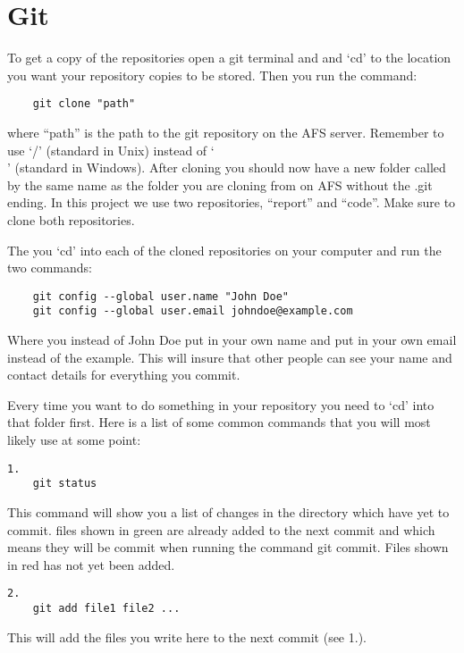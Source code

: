 \section{Git}

To get a copy of the repositories open a git terminal and and `cd' to the
location you want your repository copies to be stored. Then you run the
command:

\begin{verbatim}
	git clone "path"
\end{verbatim}

where ``path'' is the path to the git repository on the AFS server. Remember to
use `/' (standard in Unix) instead of `\\' (standard in Windows). After cloning
you should now have a new folder called by the same name as the folder you are
cloning from on AFS without the .git ending.\n
In this project we use two repositories, ``report'' and ``code''.\n
Make sure to clone both repositories.

The you `cd' into each of the cloned repositories on your computer and run the
two commands:

\begin{verbatim}
	git config --global user.name "John Doe"
	git config --global user.email johndoe@example.com
\end{verbatim}

Where you instead of John Doe put in your own name and put in your own email
instead of the example.\n
This will insure that other people can see your name and contact details for
everything you commit.

Every time you want to do something in your repository you need to `cd' into
that folder first.\n
Here is a list of some common commands that you will most likely use at some
point:


\begin{verbatim}
1.
	git status
\end{verbatim}

This command will show you a list of changes in the directory which have yet
to commit. files shown in green are already added to the next commit and which
means they will be commit when running the command git commit.\n
Files shown in red has not yet been added.

\begin{verbatim}
2.
	git add file1 file2 ...
\end{verbatim}

This will add the files you write here to the next commit (see 1.).

